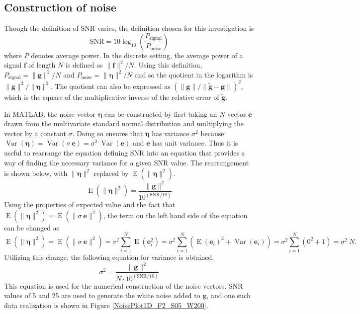 \documentclass[12pt]{article}
\newcommand{\gdis}{\mathbf{g}}
\newcommand{\gnoise}{\widetilde{\mathbf{g}}}
\newcommand{\noiseSD}{\sigma}	%
\newcommand{\noise}{\bm{\eta}}	%
\newcommand{\Var}{\operatorname{Var}}	%
\newcommand{\E}{\operatorname{E}}	%
\begin{document}
\subsection{Construction of noise} \label{sec:Construction of noise}

Though the definition of SNR varies, the definition chosen for this investigation is
\begin{equation}
\label{eq:SNR}
\text{SNR} = 10\log_{10}\left(\frac{P_{\text{signal}}}{P_{\text{noise}}}\right)
\end{equation}
where $P$ denotes average power. In the discrete setting, the average power of a signal $\mathbf{f}$ of length $N$ is defined as $\|\mathbf{f}\|^2/N$. Using this definition, $P_{\text{signal}} = \|\gdis\|^2/N$ and $P_{\text{noise}} = \|\noise\|^2/N$ and so the quotient in the logarithm is $\|\gdis\|^2/\|\noise\|^2$. The quotient can also be expressed as $(\|\gdis\|/\|\gnoise - \gdis\|)^2$, which is the square of the multiplicative inverse of the relative error of $\gnoise$. \par
In MATLAB, the noise vector $\noise$ can be constructed by first taking an $N$-vector $\mathbf{e}$ drawn from the multivariate standard normal distribution and multiplying the vector by a constant $\noiseSD$. Doing so ensures that $\noise$ has variance $\noiseSD^2$ because $\Var(\noise) = \Var(\noiseSD\:\mathbf{e}) = \noiseSD^2\:\Var(\mathbf{e})$ and $\mathbf{e}$ has unit variance. Thus it is useful to rearrange the equation defining SNR into an equation that provides a way of finding the necessary variance for a given SNR value. The rearrangement is shown below, with $\|\noise\|^2$ replaced by $\E(\|\noise\|^2)$.
\[\E(\|\noise\|^2) = \frac{\|\gdis\|^2}{10^{(\text{SNR}/10)}}\]
Using the properties of expected value and the fact that $\E(\|\noise\|^2) = \E(\|\noiseSD\:\mathbf{e}\|^2)$, the term on the left hand side of the equation can be changed as
\[\E(\|\noise\|^2) = \E(\|\noiseSD\:\mathbf{e}\|^2) = \noiseSD^2 \sum_{i=1}^N \E(\mathbf{e}_i^2) = \noiseSD^2 \sum_{i=1}^N \left(\E(\mathbf{e}_i)^2 + \Var(\mathbf{e}_i)\right) = \noiseSD^2 \sum_{i=1}^N \left(0^2 + 1\right) = \noiseSD^2\:N.\]
Utilizing this change, the following equation for variance is obtained.
\begin{equation}
\label{eq:Var}
\noiseSD^2 = \frac{\|\gdis\|^2}{N \cdot 10^{(\text{SNR}/10)}}
\end{equation}
This equation is used for the numerical construction of the noise vectors. SNR values of 5 and 25 are used to generate the white noise added to $\gdis$, and one such data realization is shown in Figure \ref{NoisePlot1D_F2_S05_W200}. \par
\end{document}
